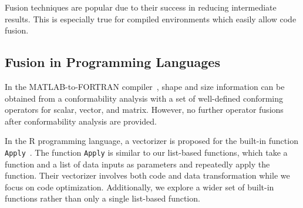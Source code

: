 


Fusion techniques are popular due to their success in reducing intermediate
results. This is especially true for compiled environments which easily
allow code fusion.

\subsection{Fusion in Programming Languages}


In the MATLAB-to-FORTRAN compiler~\cite{rose1999:techniques}, shape and size
information can be obtained from a conformability analysis with a set of
well-defined conforming operators for scalar, vector, and matrix.
However, no further operator fusions after conformability analysis are provided.

In the R programming language, a vectorizer is proposed for the built-in
function \texttt{Apply}~\cite{Wang2015:vectorization}. The function
\texttt{Apply} is similar to our list-based functions, which take
a function and a list of data inputs as parameters and repeatedly apply
the function. Their vectorizer involves both code and data transformation
while we focus on code optimization. Additionally, we explore a wider set
of built-in functions rather than only a single list-based function.

